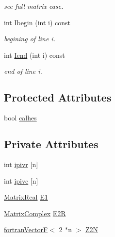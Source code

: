 \begin{DoxyCompactItemize}
\begin{DoxyCompactList}\small\item\em see full matrix case. \end{DoxyCompactList}\item 
int \hyperlink{classodes_1_1Matrices_3_01false_00_01false_00_01n_00_01nsub_00_01nsup_01_4_af3db190a47f4afcaa895bcf222f56e67}{Ibegin} (int i) const 
\begin{DoxyCompactList}\small\item\em begining of line i. \end{DoxyCompactList}\item 
int \hyperlink{classodes_1_1Matrices_3_01false_00_01false_00_01n_00_01nsub_00_01nsup_01_4_a65b1291c6d768f3d16d76308526754fb}{Iend} (int i) const 
\begin{DoxyCompactList}\small\item\em end of line i. \end{DoxyCompactList}\end{DoxyCompactItemize}
\subsection*{Protected Attributes}
\begin{DoxyCompactItemize}
\item 
bool \hyperlink{classodes_1_1Matrices_3_01false_00_01false_00_01n_00_01nsub_00_01nsup_01_4_a5aa7e9c4b65b072c0154ad5d2a7380db}{calhes}
\end{DoxyCompactItemize}
\subsection*{Private Attributes}
\begin{DoxyCompactItemize}
\item 
int \hyperlink{classodes_1_1Matrices_3_01false_00_01false_00_01n_00_01nsub_00_01nsup_01_4_aba28cdecbe597fc332619e74ffb1105f}{ipivr} \mbox{[}n\mbox{]}
\item 
int \hyperlink{classodes_1_1Matrices_3_01false_00_01false_00_01n_00_01nsub_00_01nsup_01_4_abd366955b1f19637336f72fa93f2b796}{ipivc} \mbox{[}n\mbox{]}
\item 
\hyperlink{classodes_1_1Matrices_3_01false_00_01false_00_01n_00_01nsub_00_01nsup_01_4_a16870437fa110da1b60636c6e108b357}{Matrix\-Real} \hyperlink{classodes_1_1Matrices_3_01false_00_01false_00_01n_00_01nsub_00_01nsup_01_4_aa9c25553fefa37ddf1524d2b8d098b1e}{E1}
\item 
\hyperlink{classodes_1_1Matrices_3_01false_00_01false_00_01n_00_01nsub_00_01nsup_01_4_aeedabda8f5222d638b092cd1e4cf55f0}{Matrix\-Complex} \hyperlink{classodes_1_1Matrices_3_01false_00_01false_00_01n_00_01nsub_00_01nsup_01_4_a1709aa93fc81756470531e682cb6ef16}{E2\-R}
\item 
\hyperlink{classodes_1_1fortranVectorF}{fortran\-Vector\-F}$<$ 2 $\ast$n $>$ \hyperlink{classodes_1_1Matrices_3_01false_00_01false_00_01n_00_01nsub_00_01nsup_01_4_a1e70bb1cfd110fc9ae14f8ecd66cbc85}{Z2\-N}
\end{DoxyCompactItemize}
